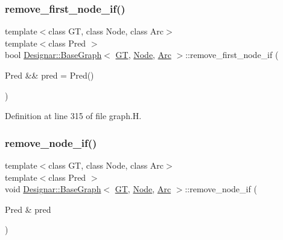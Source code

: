 \subsubsection{\texorpdfstring{remove\+\_\+first\+\_\+node\+\_\+if()}{remove\_first\_node\_if()}\hspace{0.1cm}{\footnotesize\ttfamily [2/2]}}
{\footnotesize\ttfamily template$<$class GT, class Node, class Arc$>$ \\
template$<$class Pred $>$ \\
bool \hyperlink{class_designar_1_1_base_graph}{Designar\+::\+Base\+Graph}$<$ \hyperlink{demo-buildgraph_8_c_a3001c40d2c31ca87ed96cd7d1334a55e}{GT}, \hyperlink{namespace_designar_a5af326c65aa2bd26b26c410f2030d09e}{Node}, \hyperlink{namespace_designar_a3f55fb5513d62ff47cbc8f72b8e95d6f}{Arc} $>$\+::remove\+\_\+first\+\_\+node\+\_\+if (\begin{DoxyParamCaption}\item[{Pred \&\&}]{pred = {\ttfamily Pred()} }\end{DoxyParamCaption})\hspace{0.3cm}{\ttfamily [inline]}}



Definition at line 315 of file graph.\+H.

\mbox{\label{class_designar_1_1_base_graph_aae56ca6b3b936835d07275f2ceb4b0d1}} 
\subsubsection{\texorpdfstring{remove\+\_\+node\+\_\+if()}{remove\_node\_if()}\hspace{0.1cm}{\footnotesize\ttfamily [1/2]}}
{\footnotesize\ttfamily template$<$class GT, class Node, class Arc$>$ \\
template$<$class Pred $>$ \\
void \hyperlink{class_designar_1_1_base_graph}{Designar\+::\+Base\+Graph}$<$ \hyperlink{demo-buildgraph_8_c_a3001c40d2c31ca87ed96cd7d1334a55e}{GT}, \hyperlink{namespace_designar_a5af326c65aa2bd26b26c410f2030d09e}{Node}, \hyperlink{namespace_designar_a3f55fb5513d62ff47cbc8f72b8e95d6f}{Arc} $>$\+::remove\+\_\+node\+\_\+if (\begin{DoxyParamCaption}\item[{Pred \&}]{pred }\end{DoxyParamCaption})\hspace{0.3cm}{\ttfamily [inline]}}



